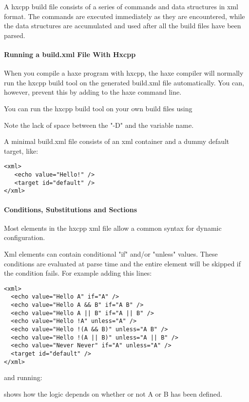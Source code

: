 A hxcpp build file consists of a series of commands and data structures in xml format.  The commands are executed immediately as they are encountered, while the data structures are accumulated and used after all the build files have been parsed.

\paragraph{Running a build.xml File With Hxcpp}
When you compile a haxe program with hxcpp, the haxe compiler will normally run the hxcpp build tool on the generated build.xml file automatically.  You can, however, prevent this by adding  to the haxe command line.

You can run the hxcpp build tool on your own build files using


Note the lack of space between the "-D" and the variable name.

A minimal build.xml file consists of an xml container and a dummy default target, like:
\begin{lstlisting}
<xml>
   <echo value="Hello!" />
   <target id="default" />
</xml>
\end{lstlisting}

\paragraph{Conditions, Substitutions and Sections}
Most elements in the hxcpp xml file allow a common syntax for dynamic configuration.

Xml elements can contain conditional "if" and/or "unless" values.  These conditions are evaluated at parse time and the entire element will be skipped if the condition fails.  For example adding this lines:
\begin{lstlisting}
<xml>
  <echo value="Hello A" if="A" />
  <echo value="Hello A && B" if="A B" />
  <echo value="Hello A || B" if="A || B" />
  <echo value="Hello !A" unless="A" />
  <echo value="Hello !(A && B)" unless="A B" />
  <echo value="Hello !(A || B)" unless="A || B" />
  <echo value="Never Never" if="A" unless="A" />
  <target id="default" />
</xml>
\end{lstlisting}

and running:


shows how the logic depends on whether or not A or B has been defined.

